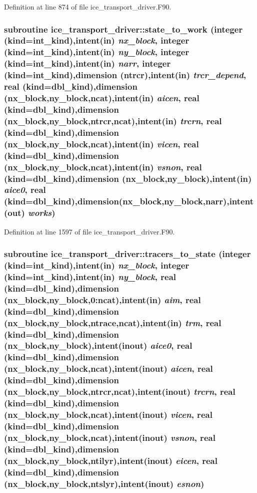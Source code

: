 Definition at line 874 of file ice\_\-transport\_\-driver.F90.\hypertarget{namespaceice__transport__driver_a922d3b29eea0cadb79c280ead41215ba}{
\subsubsection[{state\_\-to\_\-work}]{\setlength{\rightskip}{0pt plus 5cm}subroutine ice\_\-transport\_\-driver::state\_\-to\_\-work (integer (kind=int\_\-kind),intent(in) {\em nx\_\-block}, \/  integer (kind=int\_\-kind),intent(in) {\em ny\_\-block}, \/  integer (kind=int\_\-kind),intent(in) {\em narr}, \/  integer (kind=int\_\-kind),dimension (ntrcr),intent(in) {\em trcr\_\-depend}, \/  real (kind=dbl\_\-kind),dimension (nx\_\-block,ny\_\-block,ncat),intent(in) {\em aicen}, \/  real (kind=dbl\_\-kind),dimension (nx\_\-block,ny\_\-block,ntrcr,ncat),intent(in) {\em trcrn}, \/  real (kind=dbl\_\-kind),dimension (nx\_\-block,ny\_\-block,ncat),intent(in) {\em vicen}, \/  real (kind=dbl\_\-kind),dimension (nx\_\-block,ny\_\-block,ncat),intent(in) {\em vsnon}, \/  real (kind=dbl\_\-kind),dimension (nx\_\-block,ny\_\-block),intent(in) {\em aice0}, \/  real (kind=dbl\_\-kind),dimension(nx\_\-block,ny\_\-block,narr),intent(out) {\em works})}}
\label{namespaceice__transport__driver_a922d3b29eea0cadb79c280ead41215ba}


Definition at line 1597 of file ice\_\-transport\_\-driver.F90.\hypertarget{namespaceice__transport__driver_a4f5b07efec9e5b90aca1c9c43c06ba4d}{
\subsubsection[{tracers\_\-to\_\-state}]{\setlength{\rightskip}{0pt plus 5cm}subroutine ice\_\-transport\_\-driver::tracers\_\-to\_\-state (integer (kind=int\_\-kind),intent(in) {\em nx\_\-block}, \/  integer (kind=int\_\-kind),intent(in) {\em ny\_\-block}, \/  real (kind=dbl\_\-kind),dimension (nx\_\-block,ny\_\-block,0:ncat),intent(in) {\em aim}, \/  real (kind=dbl\_\-kind),dimension (nx\_\-block,ny\_\-block,ntrace,ncat),intent(in) {\em trm}, \/  real (kind=dbl\_\-kind),dimension (nx\_\-block,ny\_\-block),intent(inout) {\em aice0}, \/  real (kind=dbl\_\-kind),dimension (nx\_\-block,ny\_\-block,ncat),intent(inout) {\em aicen}, \/  real (kind=dbl\_\-kind),dimension (nx\_\-block,ny\_\-block,ntrcr,ncat),intent(inout) {\em trcrn}, \/  real (kind=dbl\_\-kind),dimension (nx\_\-block,ny\_\-block,ncat),intent(inout) {\em vicen}, \/  real (kind=dbl\_\-kind),dimension (nx\_\-block,ny\_\-block,ncat),intent(inout) {\em vsnon}, \/  real (kind=dbl\_\-kind),dimension (nx\_\-block,ny\_\-block,ntilyr),intent(inout) {\em eicen}, \/  real (kind=dbl\_\-kind),dimension (nx\_\-block,ny\_\-block,ntslyr),intent(inout) {\em esnon})}}
\label{namespaceice__transport__driver_a4f5b07efec9e5b90aca1c9c43c06ba4d}


